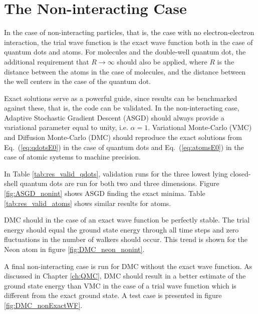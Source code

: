 \section{The Non-interacting Case}

In the case of non-interacting particles, that is, the case with no electron-electron interaction, the trial wave function is the exact wave function both in the case of quantum dots and atoms. For molecules and the double-well quantum dot, the additional requirement that $R\to\infty$ should also be applied, where $R$ is the distance between the atoms in the case of molecules, and the distance between the well centers in the case of the quantum dot. 

Exact solutions serve as a powerful guide, since results can be benchmarked against these, that is, the code can be validated. In the non-interacting case, Adaptive Stochastic Gradient Descent (ASGD) should always provide a variational parameter equal to unity, i.e. $\alpha=1$. Variational Monte-Carlo (VMC) and Diffusion Monte-Carlo (DMC) should reproduce the exact solutions from Eq.~(\ref{eq:qdotsE0}) in the case of quantum dots and Eq.~(\ref{eq:atomsE0}) in the case of atomic systems to machine precision. 

In Table \ref{tab:res_valid_qdots}, validation runs for the three lowest lying closed-shell quantum dots are run for both two and three dimensions. Figure \ref{fig:ASGD_nonint} shows ASGD finding the exact minima. Table \ref{tab:res_valid_atoms} shows similar results for atoms.

DMC should in the case of an exact wave function be perfectly stable. The trial energy should equal the ground state energy through all time steps and zero fluctuations in the number of walkers should occur. This trend is shown for the Neon atom in figure \ref{fig:DMC_neon_nonint}.

A final non-interacting case is run for DMC without the exact wave function. As discussed in Chapter \ref{ch:QMC}, DMC should result in a better estimate of the ground state energy than VMC in the case of a trial wave function which is different from the exact ground state. A test case is presented in figure \ref{fig:DMC_nonExactWF}.

